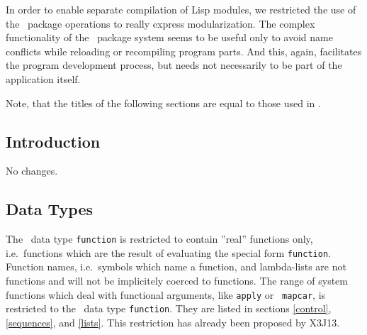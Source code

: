 In order to enable separate compilation of Lisp modules, we restricted
the use of the \CL\ package operations to really express
modularization. The complex functionality of the \CL\ package system
seems to be useful only to avoid name conflicts while reloading or
recompiling program parts. And this, again, facilitates the program
development process, but needs not necessarily to be part of the
application itself.


Note, that the titles of the following sections are equal to those
used in \cite{Steele84}.

\subsection{Introduction}

No changes.

\subsection{Data Types}

The \CL\ data type {\tt function} is restricted to contain ''real''
functions only, i.e.\ functions which are the result of evaluating the
special form {\tt function}. Function names, i.e.\ symbols which name
a function, and lambda-lists are not functions and will not be
implicitely coerced to functions. The range of system functions
which deal with functional arguments, like {\tt apply} or {\tt
mapcar}, is restricted to the \ data type {\tt function}. They are
listed in sections \ref{control}, \ref{sequences}, and
\ref{lists}. This restriction has already been proposed by X3J13.


